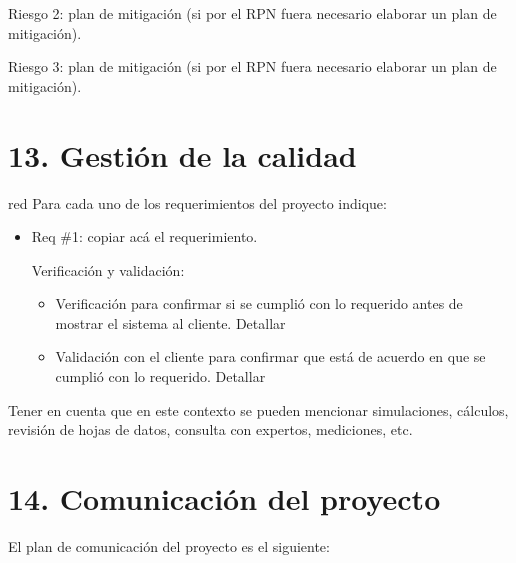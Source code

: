 \documentclass[11pt]{charter}
\begin{document}
Riesgo 2: plan de mitigación (si por el RPN fuera necesario elaborar un plan de mitigación).
 
Riesgo 3: plan de mitigación (si por el RPN fuera necesario elaborar un plan de mitigación).



\section{13. Gestión de la calidad}
\label{sec:calidad}

\begin{consigna}{red}
Para cada uno de los requerimientos del proyecto indique:
\begin{itemize} 
\item Req \#1: copiar acá el requerimiento.

Verificación y validación:

\begin{itemize}
\item Verificación para confirmar si se cumplió con lo requerido antes de mostrar el sistema al cliente. Detallar 
\item Validación con el cliente para confirmar que está de acuerdo en que se cumplió con lo requerido. Detallar  
\end{itemize}

\end{itemize}

Tener en cuenta que en este contexto se pueden mencionar simulaciones, cálculos, revisión de hojas de datos, consulta con expertos, mediciones, etc.

\end{consigna}

\section{14. Comunicación del proyecto}
\label{sec:comunicaciones}

El plan de comunicación del proyecto es el siguiente:
\end{document}
